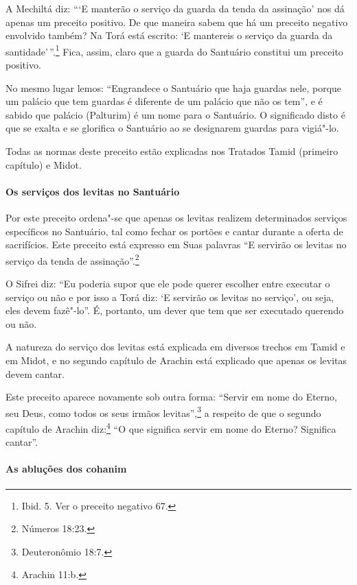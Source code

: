 \begin{multicols}{2}
A Mechiltá\starr{} diz: ```E manterão o serviço da guarda da tenda da assinação'
nos dá apenas um preceito positivo. De que maneira sabem que há um
preceito negativo envolvido também? Na Torá\starr{} está escrito: `E mantereis
o serviço da guarda da santidade'\,''.\footnote{Ibid. 5. Ver o preceito negativo 67.} Fica, assim, claro que a guarda do Santuário constitui um preceito positivo.

No mesmo lugar lemos: ``Engrandece o Santuário que haja guardas nele,
porque um palácio que tem guardas é diferente de um palácio que não os
tem'', e é sabido que palácio (Palturim) é um nome para o Santuário. O
significado disto é que se exalta e se glorifica o Santuário ao se
designarem guardas para vigiá"-lo.

Todas as normas deste preceito estão explicadas nos Tratados Tamid\starr{}
(primeiro capítulo) e Midot\starr.

\paragraph{Os serviços dos levitas\starr{} no Santuário}

Por este preceito ordena"-se que apenas os levitas\starr{} realizem determinados
serviços específicos no Santuário, tal como fechar os portões e cantar
durante a oferta de sacrifícios. Este preceito está expresso em Suas
palavras ``E servirão os levitas\starr{} no serviço da tenda de assinação''.\footnote{Números 18:23.}

O Sifrei\starr{} diz: ``Eu poderia supor que ele pode querer escolher entre
executar o serviço ou não e por isso a Torá\starr{} diz: `E servirão os levitas\starr{}
no serviço', ou seja, eles devem fazê"-lo''. É, portanto, um dever que
tem que ser executado querendo ou não.

A natureza do serviço dos levitas\starr{} está explicada em diversos trechos em
Tamid\starr{} e em Midot\starr, e no segundo capítulo de Arachin\star{} está explicado que
apenas os levitas\starr{} devem cantar.

Este preceito aparece novamente sob outra forma: ``Servir em nome do
Eterno, seu Deus, como todos os seus irmãos levitas\starr{}'',\footnote{Deuteronômio
18:7.} a respeito de que o segundo capítulo de Arachin\star{}
diz:\footnote{Arachin 11:b.} ``O que significa servir em nome do Eterno?
Significa cantar''.

\paragraph{As abluções dos cohanim\starr{}}


\end{multicols}
